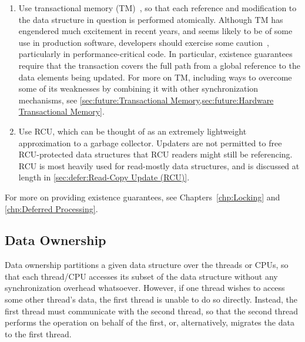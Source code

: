 {\begin{enumerate}
	\item	Use transactional memory
		(TM)~\cite{Herlihy93a,DBLomet1977SIGSOFT,Shavit95},
		so that each reference and
		modification to the data structure in question is
		performed atomically.
		Although TM has engendered much excitement in recent years,
		and seems likely to be of some use in production software,
		developers should exercise some
		caution~\cite{Blundell2005DebunkTM,Blundell2006TMdeadlock,McKenney2007PLOSTM},
		particularly in performance-critical code.
		In particular, existence guarantees require that the
		transaction covers the full path from a global reference
		to the data elements being updated.
		For more on TM, including ways to overcome some of its
		weaknesses by combining it with other synchronization
		mechanisms, see
		\cref{sec:future:Transactional Memory,sec:future:Hardware Transactional Memory}.
	\item	Use RCU, which can be thought of as an extremely lightweight
		approximation to a garbage collector.
		Updaters are not permitted to free RCU-protected
		data structures that RCU readers might still be referencing.
		RCU is most heavily used for read-mostly data structures,
		and is discussed at length in
		\cref{sec:defer:Read-Copy Update (RCU)}.
	\end{enumerate}

	For more on providing existence guarantees, see
	Chapters~\ref{chp:Locking} and \ref{chp:Deferred Processing}.
}\QuickQuizEnd

\subsection{Data Ownership}
\label{sec:SMPdesign:Data Ownership}

Data ownership partitions a given data structure over the threads
or CPUs, so that each thread/CPU accesses its subset of the data
structure without any synchronization overhead whatsoever.
However, if one thread wishes to access some other thread's data,
the first thread is unable to do so directly.
Instead, the first thread must communicate with the second thread,
so that the second thread performs the operation on behalf of the
first, or, alternatively, migrates the data to the first thread.

